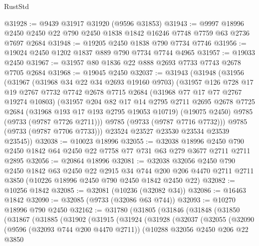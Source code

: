 \begin{lexlean}{RustStd}
\begin{coremodule}
@31928 := @9439 @31917 @31920 (@9596 @31853)
@31943 := @9997
    @18996
    @2450
    @2450
    @22
    @790
    @2450
    @1838
    @1842
    @16246
    @7748
    @7759
    @63
    @2736
    @7697
    @2684
@31948 := @19205 @2450 @1838 @790 @7734 @7746
@31956 := @19024 @2450 @1202 @1837 @889 @790 @7734 @7744 @4965
@31957 := @19033 @2450
@31967 := @31957 @80 @1836 @22 @888 @2693 @7733 @7743 @2678 @7705 @2684
@31968 := @19045 @2450
@32037 := @31943
    (@31948
      (@31956
        (@31967
          (@31968 @34 @22 @34 @2693 @19160 @9703)
          (@31957
            @126
            @728
            @17
            @19
            @2767
            @7732
            @7742
            @2678
            @7715
            @2684
            (@31968 @77 @17 @77 @2767 @19274 @10803)
            (@31957
              @204
              @82
              @17
              @14
              @2795
              @2711
              @2695
              @2678
              @7725
              @2684
              (@31968 @193 @17 @193 @2795 @19053 @10719)
              (@19075 @2450)
              @9785
              (@9733 (@9787 @7726 @2711)))
            @9785
            (@9733 (@9787 @7716 @7732)))
          @9785
          (@9733 (@9787 @7706 @7733)))
        @23524
        @23527
        @23530
        @23534
        @23539
        @23545))
@32038 := @10023 @18996
@32055 := @32038
    @18996
    @2450
    @790
    @2450
    @1842
    @64
    @2450
    @22
    @7758
    @77
    @731
    @63
    @279
    @3677
    @2711
    @2711
    @2895
@32056 := @20864 @18996
@32081 := @32038
    @32056
    @2450
    @790
    @2450
    @1842
    @63
    @2450
    @22
    @2915
    @34
    @744
    @200
    @206
    @4470
    @2711
    @2711
    @3850
    (@10226 @18996 @2450 @790 @2450 @1842 @2450 @22)
@32082 := @10256 @1842
@32085 := @32081 (@10236 (@32082 @34))
@32086 := @16463 @1842
@32090 := @32085 (@9733 (@32086 @63 @744))
@32093 := @10270 @18996 @790 @2450
@32162 := @31780
    (@31805
      (@31846
        (@31848
          (@31850
            (@31867
              (@31885
                (@31902
                  (@31915
                    (@31924
                      (@31928
                        (@32037
                          (@32055
                            (@32090
                              (@9596 (@32093 @744 @200 @4470 @2711))
                              (@10288
                                @32056
                                @2450
                                @206
                                @22
                                @3850

\end{coremodule}
\end{lexlean}
